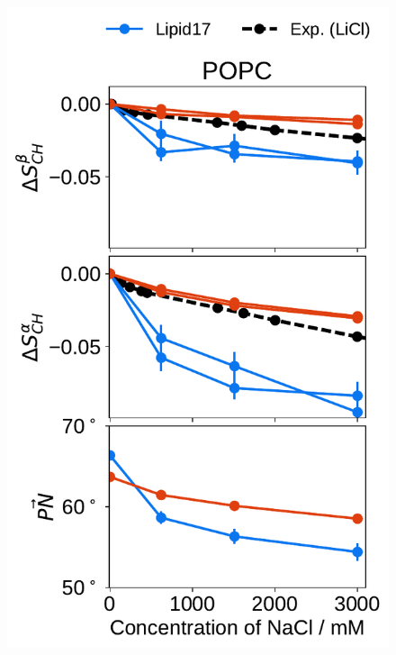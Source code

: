 \documentclass[journal=jpcbfk,manuscript=article]{achemso}
\newlength{\figheight}
\begin{document}
 
 
\begin{figure}[tbp!] 
  \centering 
  \includegraphics[height=\figheight]{../img/ecc_pops/order_parameters_changes_ecc-lip_L14_A-B-PN-COO_POPC_nacl.pdf} 

\end{figure}
\end{document}
